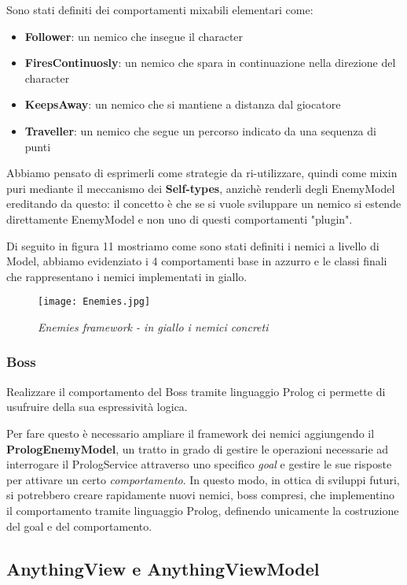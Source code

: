 Sono stati definiti dei comportamenti mixabili elementari come:
\begin{itemize}
    \item \textbf{Follower}: un nemico che insegue il character
    \item \textbf{FiresContinuosly}: un nemico che spara in continuazione nella direzione del character
    \item \textbf{KeepsAway}: un nemico che si mantiene a distanza dal giocatore
    \item \textbf{Traveller}: un nemico che segue un percorso indicato da una sequenza di punti
\end{itemize}

Abbiamo pensato di esprimerli come strategie da ri-utilizzare, quindi come mixin puri mediante il meccanismo dei \textbf{Self-types}, anzichè renderli degli EnemyModel ereditando da questo: il concetto è che se si vuole sviluppare un nemico si estende direttamente EnemyModel e non uno di questi comportamenti "plugin".

Di seguito in figura 11 mostriamo come sono stati definiti i nemici a livello di Model, abbiamo evidenziato i 4 comportamenti base in azzurro e le classi finali che rappresentano i nemici implementati in giallo.

\begin{figure}[!hbt]
    \centering
    \texttt{[image: Enemies.jpg]}
    \caption{\textit{Enemies framework - in giallo i nemici concreti}}
\end{figure}

\subsubsection{Boss}

Realizzare il comportamento del Boss tramite linguaggio Prolog ci permette di usufruire della sua espressività logica.

Per fare questo è necessario ampliare il framework dei nemici aggiungendo il \textbf{PrologEnemyModel}, 
un tratto in grado di gestire le operazioni necessarie ad interrogare il PrologService attraverso uno specifico \textit{goal} 
e gestire le sue risposte per attivare un certo \textit{comportamento}.
In questo modo, in ottica di sviluppi futuri, si potrebbero creare rapidamente nuovi nemici, boss compresi, che implementino il comportamento tramite linguaggio Prolog, definendo unicamente la costruzione del goal e del comportamento.

\subsection{AnythingView e AnythingViewModel}
 
